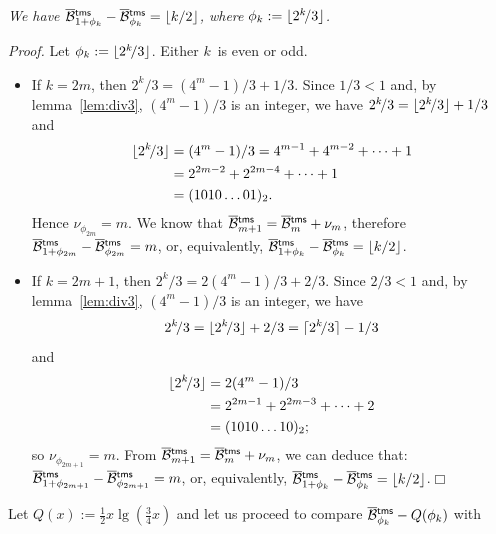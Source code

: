 \begin{thm}
\label{thm:OB_lambda}
\textsl{We have \(\OB{\mathsf{tms}}{1+\phi_k} -
  \OB{\mathsf{tms}}{\phi_k} = \floor{k/2}\), where \(\phi_k :=
  \lfloor{2^k\!/3}\rfloor\).}
\end{thm}
\noindent \emph{Proof.} Let \(\phi_k := \lfloor{2^k\!/3}\rfloor\). Either
\(k\)~is even or odd.
\begin{itemize}

  \item If \(k=2m\), then \(2^k\!/3 = (4^m-1)/3 + 1/3\). Since
    \(1/3<1\) and, by lemma~\ref{lem:div3}, \((4^m-1)/3\) is an
    integer, we have \(2^k\!/3 = \lfloor{2^k\!/3}\rfloor + 1/3\) and
    \begin{align*}
      \lfloor{2^k\!/3}\rfloor &= (4^m-1)/3 = 4^{m-1} + 4^{m-2} + \dots + 1\\
                      &= 2^{2m-2} + 2^{2m-4} + \dots + 1\\
                      &= (1010\dots01)_2.
    \end{align*}
    Hence \(\nu_{\phi_{2m}} = m\). We know that \(\OB{\fun{tms}}{m+1} =
    \OB{\fun{tms}}{m} + \nu_m\), therefore
    \(\OB{\fun{tms}}{1+\phi_{2m}} - \OB{\fun{tms}}{\phi_{2m}} = m\),
    or, equivalently, \(\OB{\fun{tms}}{1+\phi_k} -
    \OB{\fun{tms}}{\phi_k} = \floor{k/2}\).

  \item If \(k=2m+1\), then \(2^k\!/3 = 2(4^m-1)/3 + 2/3\). Since
    \(2/3<1\) and, by lemma~\ref{lem:div3}, \((4^m-1)/3\) is an
    integer, we have
    \begin{equation*}
      2^k\!/3 = \lfloor{2^k\!/3}\rfloor + 2/3 = \lceil{2^k\!/3}\rceil - 1/3
    \end{equation*}
    and
    \begin{align*}
      \lfloor{2^k\!/3}\rfloor &= 2(4^m-1)/3\\
                      &= 2^{2m-1} + 2^{2m-3} + \dots + 2\\
                      &= (1010\dots10)_2;
    \end{align*}
    so \(\nu_{\phi_{2m+1}} = m\). From \(\OB{\fun{tms}}{m+1} =
    \OB{\fun{tms}}{m} + \nu_m\), we can deduce that:
    \(\OB{\fun{tms}}{1+\phi_{2m+1}} - \OB{\fun{tms}}{\phi_{2m+1}} =
    m\), or, equivalently,
    \(\OB{\fun{tms}}{1+\phi_k} - \OB{\fun{tms}}{\phi_k} =
    \floor{k/2}\).\hfill\(\Box\)

\end{itemize}
\noindent Let \(Q(x) := \tfrac{1}{2}x\lg(\tfrac{3}{4}x)\) and let us
proceed to compare \(\OB{\fun{tms}}{\phi_k} - Q(\phi_k)\) with

